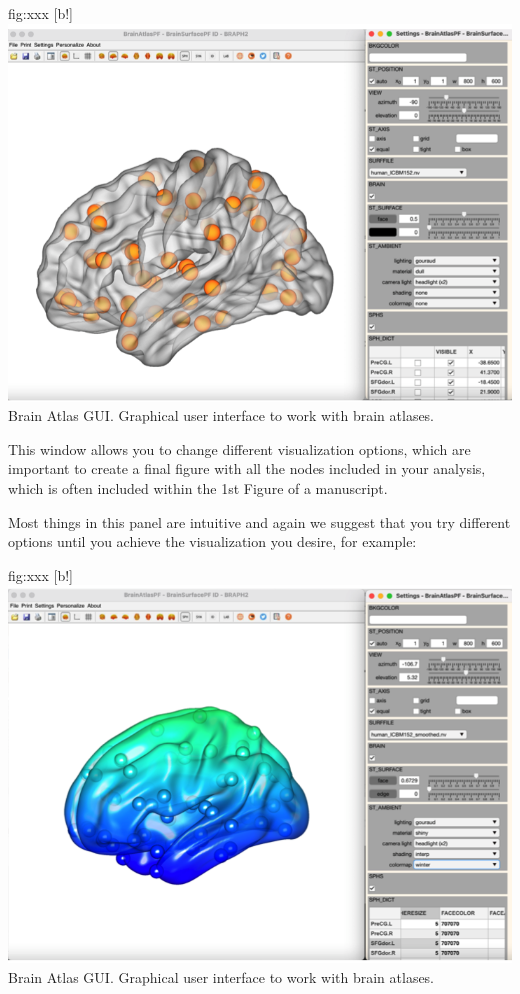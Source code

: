 \documentclass{tufte-handout}
\begin{document}
	{fig:xxx}
	{
	[b!]
	\includegraphics{tut_ba/fig3.png}
	}
	{Brain Atlas GUI.}
	{
	Graphical user interface to work with brain atlases. 
	}

This window allows you to change different visualization options, which are important to create a final figure with all the nodes included in your analysis, which is often included within the 1st Figure of a manuscript.


Most things in this panel are intuitive and again we suggest that you try different options until you achieve the visualization you desire, for example:

	{fig:xxx}
	{
	[b!]
	\includegraphics{tut_ba/fig4.png}
	}
	{Brain Atlas GUI.}
	{
	Graphical user interface to work with brain atlases. 
	}
\end{document}
